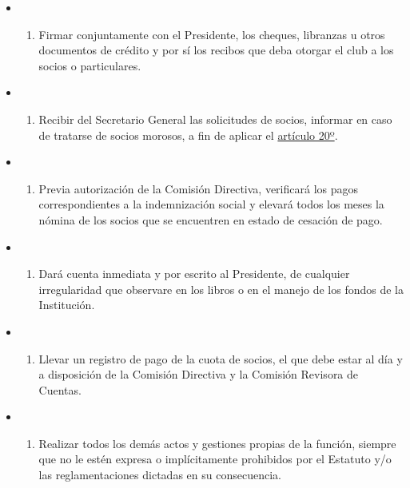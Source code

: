 \documentclass[openany]{book}
\providecommand{\tightlist}{%
  \setlength{\itemsep}{0pt}\setlength{\parskip}{0pt}}
\begin{document}
\begin{itemize}
\begin{itemize}
\begin{enumerate}
    \end{enumerate}
  \item
    \begin{enumerate}
    \def\labelenumi{\alph{enumi})}
    \setcounter{enumi}{5}
    \tightlist
    \item
      Firmar conjuntamente con el Presidente, los cheques, libranzas u otros documentos de crédito y por sí los recibos que deba otorgar el club a los socios o particulares.
    \end{enumerate}
  \item
    \begin{enumerate}
    \def\labelenumi{\alph{enumi})}
    \setcounter{enumi}{6}
    \tightlist
    \item
      Recibir del Secretario General las solicitudes de socios, informar en caso de tratarse de socios morosos, a fin de aplicar el \protect\hyperlink{art20}{artículo 20º}.
    \end{enumerate}
  \item
    \begin{enumerate}
    \def\labelenumi{\alph{enumi})}
    \setcounter{enumi}{7}
    \tightlist
    \item
      Previa autorización de la Comisión Directiva, verificará los pagos correspondientes a la indemnización social y elevará todos los meses la nómina de los socios que se encuentren en estado de cesación de pago.
    \end{enumerate}
  \item
    \begin{enumerate}
    \def\labelenumi{\roman{enumi})}
    \tightlist
    \item
      Dará cuenta inmediata y por escrito al Presidente, de cualquier irregularidad que observare en los libros o en el manejo de los fondos de la Institución.
    \end{enumerate}
  \item
    \begin{enumerate}
    \def\labelenumi{\alph{enumi})}
    \setcounter{enumi}{9}
    \tightlist
    \item
      Llevar un registro de pago de la cuota de socios, el que debe estar al día y a disposición de la Comisión Directiva y la Comisión Revisora de Cuentas.
    \end{enumerate}
  \item
    \begin{enumerate}
    \def\labelenumi{\alph{enumi})}
    \setcounter{enumi}{10}
    \tightlist
    \item
      Realizar todos los demás actos y gestiones propias de la función, siempre que no le estén expresa o implícitamente prohibidos por el Estatuto y/o las reglamentaciones dictadas en su consecuencia.
    \end{enumerate}
  \end{itemize}
\end{itemize}
\end{document}
